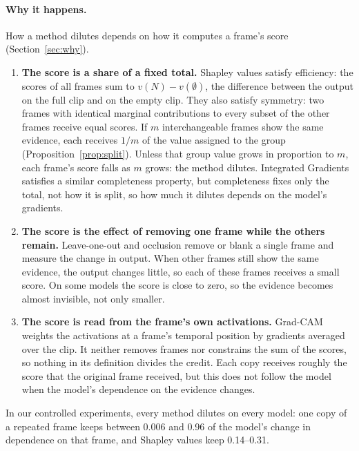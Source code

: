 \paragraph{Why it happens.}
How a method dilutes depends on how it computes a frame's score (Section~\ref{sec:why}).
\begin{enumerate}
  \item \textbf{The score is a share of a fixed total.}
  Shapley values satisfy efficiency: the scores of all frames sum to $v(N) - v(\emptyset)$, the difference between the output on the full clip and on the empty clip.
  They also satisfy symmetry: two frames with identical marginal contributions to every subset of the other frames receive equal scores.
  If $m$ interchangeable frames show the same evidence, each receives $1/m$ of the value assigned to the group (Proposition~\ref{prop:split}).
  Unless that group value grows in proportion to $m$, each frame's score falls as $m$ grows: the method dilutes.
  Integrated Gradients satisfies a similar completeness property, but completeness fixes only the total, not how it is split, so how much it dilutes depends on the model's gradients.
  \item \textbf{The score is the effect of removing one frame while the others remain.}
  Leave-one-out and occlusion remove or blank a single frame and measure the change in output.
  When other frames still show the same evidence, the output changes little, so each of these frames receives a small score.
On some models the score is close to zero, so the evidence becomes almost invisible, not only smaller.
  \item \textbf{The score is read from the frame's own activations.}
  Grad-CAM weights the activations at a frame's temporal position by gradients averaged over the clip.
  It neither removes frames nor constrains the sum of the scores, so nothing in its definition divides the credit.
  Each copy receives roughly the score that the original frame received, but this does not follow the model when the model's dependence on the evidence changes.
\end{enumerate}
In our controlled experiments, every method dilutes on every model: one copy of a repeated frame keeps between 0.006 and 0.96 of the model's change in dependence on that frame, and Shapley values keep 0.14--0.31.

